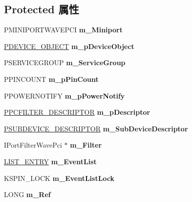 \subsection*{Protected 属性}
\begin{DoxyCompactItemize}
\item 
\mbox{\label{class_c_port_wave_pci_a233d783ae9bbeb2f83a2b18c02abc0a8}} 
P\+M\+I\+N\+I\+P\+O\+R\+T\+W\+A\+V\+E\+P\+CI {\bfseries m\+\_\+\+Miniport}
\item 
\mbox{\label{class_c_port_wave_pci_ad314e93d20ac79e161cde802567777f1}} 
\hyperlink{struct___d_e_v_i_c_e___o_b_j_e_c_t}{P\+D\+E\+V\+I\+C\+E\+\_\+\+O\+B\+J\+E\+CT} {\bfseries m\+\_\+p\+Device\+Object}
\item 
\mbox{\label{class_c_port_wave_pci_a22bdcd00deaa882e6c17fa16183fd617}} 
P\+S\+E\+R\+V\+I\+C\+E\+G\+R\+O\+UP {\bfseries m\+\_\+\+Service\+Group}
\item 
\mbox{\label{class_c_port_wave_pci_adf0d0084d95d705664cd017968532440}} 
P\+P\+I\+N\+C\+O\+U\+NT {\bfseries m\+\_\+p\+Pin\+Count}
\item 
\mbox{\label{class_c_port_wave_pci_a31117482a971495932d96c2d3fabab89}} 
P\+P\+O\+W\+E\+R\+N\+O\+T\+I\+FY {\bfseries m\+\_\+p\+Power\+Notify}
\item 
\mbox{\label{class_c_port_wave_pci_a8fa6295bb2becaf2269432849c1dbe5d}} 
\hyperlink{struct_p_c_f_i_l_t_e_r___d_e_s_c_r_i_p_t_o_r}{P\+P\+C\+F\+I\+L\+T\+E\+R\+\_\+\+D\+E\+S\+C\+R\+I\+P\+T\+OR} {\bfseries m\+\_\+p\+Descriptor}
\item 
\mbox{\label{class_c_port_wave_pci_a7485d41932bef74cf429d7c67a7a53c7}} 
\hyperlink{struct_s_u_b_d_e_v_i_c_e___d_e_s_c_r_i_p_t_o_r}{P\+S\+U\+B\+D\+E\+V\+I\+C\+E\+\_\+\+D\+E\+S\+C\+R\+I\+P\+T\+OR} {\bfseries m\+\_\+\+Sub\+Device\+Descriptor}
\item 
\mbox{\label{class_c_port_wave_pci_a7f6936e1645e0454dcb0e67759342d69}} 
I\+Port\+Filter\+Wave\+Pci $\ast$ {\bfseries m\+\_\+\+Filter}
\item 
\mbox{\label{class_c_port_wave_pci_a417a0ae47333c6b39a1e41f7424767af}} 
\hyperlink{struct___l_i_s_t___e_n_t_r_y}{L\+I\+S\+T\+\_\+\+E\+N\+T\+RY} {\bfseries m\+\_\+\+Event\+List}
\item 
\mbox{\label{class_c_port_wave_pci_adbeed761c586c890f8f9de7b001d2969}} 
K\+S\+P\+I\+N\+\_\+\+L\+O\+CK {\bfseries m\+\_\+\+Event\+List\+Lock}
\item 
\mbox{\label{class_c_port_wave_pci_a6872aa146ba79748fa2188ec8645dc92}} 
L\+O\+NG {\bfseries m\+\_\+\+Ref}
\end{DoxyCompactItemize}
